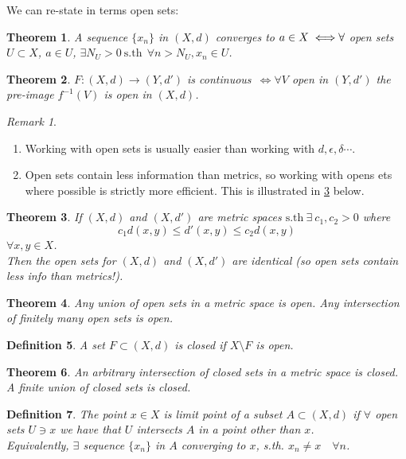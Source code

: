\documentclass{article}
\let\ddd\cdots
\newcommand{\sth}{\mathrm{s.th}\ }
\newcommand{\cts}{continuous\ }
\newtheorem{theorem}{Theorem}[section]
\newtheorem{definition}[theorem]{Definition}
\theoremstyle{remark}
\theoremstyle{example}
\theoremstyle{examples}
\newtheorem*{remark}{Remark}
\begin{document}
	We can re-state in terms open sets:
	\begin{theorem}
		A sequence $\{x_n\}$ in $(X,d)$ converges to $a \in X \iff\\ \forall $ open sets $U \subset X$, $a \in U$, $\exists N_U > 0\ \sth\ \forall n > N_U, x_n \in U$.
	\end{theorem}

	\begin{theorem}
		$F:(X,d) \to (Y,d')$ is \cts $\iff \forall V$ open in $(Y,d')$ the pre-image $f^{-1}(V)$ is open in $(X,d)$.
	\end{theorem}

	\begin{remark}\ 
		\begin{enumerate}
			\item Working with open sets is usually easier than working with $d, \epsilon, \delta\ddd$.
			\item Open sets contain less information than metrics, so working with opens ets where possible is strictly more efficient. This is illustrated in \ref{opensetslessinfothanmetrics} below.
		\end{enumerate}
	\end{remark}
	
	\begin{theorem}
		\label{opensetslessinfothanmetrics}
		If $(X,d)$ and $(X,d')$ are metric spaces $\sth \exists\ c_1, c_2 > 0$ where \[c_1 d(x,y) \leq d'(x,y) \leq c_2 d(x,y) \] $\forall x,y \in X$.\\Then the open sets for $(X,d)$ and $(X,d')$ are identical (so open sets contain less info than metrics!).
	\end{theorem}

	\begin{theorem}
		Any union of open sets in a metric space is open. Any intersection of finitely many open sets is open.
	\end{theorem}
	
	\begin{definition}
		A set $F \subset(X,d)$ is closed if $X \setminus F$ is open.
	\end{definition}

	\begin{theorem}
		An arbitrary intersection of closed sets in a metric space is closed. A finite union of closed sets is closed.
	\end{theorem}

	\begin{definition}
		The point $x \in X$ is  limit point of a subset $A \subset(X,d)$ if $\forall$ open sets $U \ni x$ we have that $U$ intersects $A$ in a point other than $x$.\\
		Equivalently, $\exists$ sequence $\{x_n\}$ in $A$ converging to $x$, s.th. $x_n \neq x\quad \forall n$.
	\end{definition}
\end{document}
